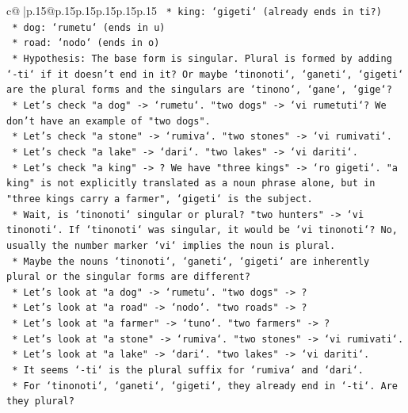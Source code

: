 \documentclass{article}
\begin{document}
{\begin{supertabular}{c@{$\;$}|p{.15\linewidth}@{}p{.15\linewidth}p{.15\linewidth}p{.15\linewidth}p{.15\linewidth}p{.15\linewidth}}
{{{\texttt{                *   king: `gigeti` (already ends in ti?)} \\
\texttt{                *   dog: `rumetu` (ends in u)} \\
\texttt{                *   road: `nodo` (ends in o)} \\
\texttt{            *   Hypothesis: The base form is singular. Plural is formed by adding `{-}ti` if it doesn't end in it? Or maybe `tinonoti`, `ganeti`, `gigeti` are the plural forms and the singulars are `tinono`, `gane`, `gige`?} \\
\texttt{            *   Let's check "a dog" {-}> `rumetu`. "two dogs" {-}> `vi rumetuti`? We don't have an example of "two dogs".} \\
\texttt{            *   Let's check "a stone" {-}> `rumiva`. "two stones" {-}> `vi rumivati`.} \\
\texttt{            *   Let's check "a lake" {-}> `dari`. "two lakes" {-}> `vi dariti`.} \\
\texttt{            *   Let's check "a king" {-}> ? We have "three kings" {-}> `ro gigeti`. "a king" is not explicitly translated as a noun phrase alone, but in "three kings carry a farmer", `gigeti` is the subject.} \\
\texttt{            *   Wait, is `tinonoti` singular or plural? "two hunters" {-}> `vi tinonoti`. If `tinonoti` was singular, it would be `vi tinonoti`? No, usually the number marker `vi` implies the noun is plural.} \\
\texttt{            *   Maybe the nouns `tinonoti`, `ganeti`, `gigeti` are inherently plural or the singular forms are different?} \\
\texttt{            *   Let's look at "a dog" {-}> `rumetu`. "two dogs" {-}> ?} \\
\texttt{            *   Let's look at "a road" {-}> `nodo`. "two roads" {-}> ?} \\
\texttt{            *   Let's look at "a farmer" {-}> `tuno`. "two farmers" {-}> ?} \\
\texttt{            *   Let's look at "a stone" {-}> `rumiva`. "two stones" {-}> `vi rumivati`.} \\
\texttt{            *   Let's look at "a lake" {-}> `dari`. "two lakes" {-}> `vi dariti`.} \\
\texttt{            *   It seems `{-}ti` is the plural suffix for `rumiva` and `dari`.} \\
\texttt{            *   For `tinonoti`, `ganeti`, `gigeti`, they already end in `{-}ti`. Are they plural?} \\
}}}
\end{supertabular}}
\end{document}
